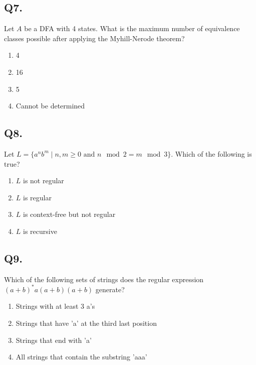 \vspace{1em}

\subsection*{Q7.}
Let $A$ be a DFA with 4 states. What is the maximum number of equivalence classes possible after applying the Myhill-Nerode theorem?

\begin{enumerate}[label=(\alph*)]
    \item 4  
    \item 16  
    \item 5  
    \item Cannot be determined  
\end{enumerate}

\vspace{1em}

\subsection*{Q8.}
Let $L = \{a^n b^m \mid n, m \geq 0 \text{ and } n \mod 2 = m \mod 3 \}$. Which of the following is true?

\begin{enumerate}[label=(\alph*)]
    \item $L$ is not regular  
    \item $L$ is regular  
    \item $L$ is context-free but not regular  
    \item $L$ is recursive  
\end{enumerate}

\vspace{1em}

\subsection*{Q9.}
Which of the following sets of strings does the regular expression $(a+b)^*a(a+b)(a+b)$ generate?

\begin{enumerate}[label=(\alph*)]
    \item Strings with at least 3 a’s  
    \item Strings that have 'a' at the third last position  
    \item Strings that end with 'a'  
    \item All strings that contain the substring 'aaa'  
\end{enumerate}

